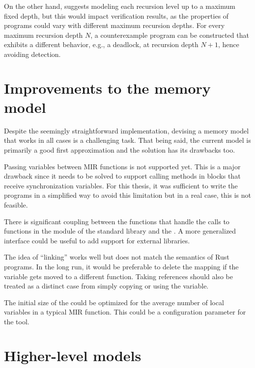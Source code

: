 On the other hand, \cite{meyer2020} suggests
modeling each recursion level up to a maximum fixed depth,
but this would impact verification results,
as the properties of programs could vary with different maximum recursion depths.
For every maximum recursion depth $N$, a counterexample program can be constructed that exhibits
a different behavior, e.g., a deadlock, at recursion depth $N+1$, hence avoiding detection.

\section{Improvements to the memory model}
\label{sec:future-work-memory-model}

Despite the seemingly straightforward implementation,
devising a memory model that works in all cases is a challenging task.
That being said, the current model is primarily a good first approximation
and the solution has its drawbacks too.

Passing variables between \acrshort{MIR} functions is not supported yet.
This is a major drawback since it needs to be solved to support calling methods
in  blocks that receive synchronization variables.
For this thesis, it was sufficient to write the programs in a simplified way to
avoid this limitation but in a real case, this is not feasible.

There is significant coupling between the functions that handle the calls to
functions in the  module of the standard library and the .
A more generalized interface could be useful to add support for external libraries.

The idea of ``linking'' works well but does not match the semantics of Rust programs.
In the long run, it would be preferable to delete the mapping
if the variable gets moved to a different function.
Taking references should also be treated as a distinct case
from simply copying or using the variable.

The initial size of the  could be optimized
for the average number of local variables in a typical \acrshort{MIR} function.
This could be a configuration parameter for the tool.

\section{Higher-level models}
\label{sec:future-work-higher-level-models}